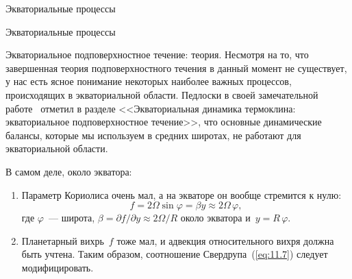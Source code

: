 \begin{chapter}{Экваториальные процессы}
\begin{section}{Экваториальные процессы}
\begin{paragraph}{Экваториальное подповерхностное течение: теория.}
%
Несмотря на то, что завершенная теория подповерхностного течения в данный
момент не существует, у нас есть ясное
понимание некоторых наиболее важных процессов, происходящих в
экваториальной области. Педлоски в своей замечательной работе~\cite{Pedlosky:1996}
отметил в разделе <<Экваториальная динамика термоклина: экваториальное 
подповерхностное течение>>, что основные динамические балансы, которые мы
используем в средних широтах, не работают для экваториальной области.
%

В самом деле, около экватора:
\begin{enumerate}
\item
Параметр Кориолиса очень мал, 
а на экваторе он вообще стремится к нулю:
\begin{equation}
 f=2\Omega \sin\varphi = \beta y \approx 2\Omega \,\varphi,
\end{equation}
где $\varphi$~--- широта, $\beta = \partial f/\partial y \approx 2\Omega/R$ 
около экватора и~$y=R\,\varphi$.
%

\item
Планетарный вихрь~$f$ тоже мал, и адвекция относительного
вихря должна быть учтена. Таким образом, соотношение Свердрупа~(\ref{eq:11.7}) 
следует модифицировать.
%


\end{enumerate}
\end{paragraph}
\end{section}
\end{chapter}
